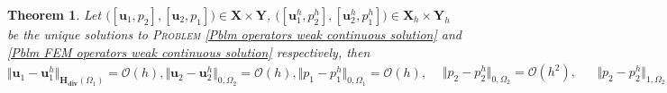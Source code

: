 \documentclass[3p]{elsarticle}
\newtheorem{theorem}{Theorem}
\def\X{\mathbf X}
\def\Y{\mathbf Y}
\def\uone{\mathbf{u}_{1}}
\def\uoneh{\mathbf{u}_{1}^{h}}
\def\utwo{\mathbf{u}_{2}}
\def\utwoh{\mathbf{u}_{2}^{h}}
\def\Hdiv{\mathbf{H_{div}}}
\def\pone{p_{1}}
\def\poneh{p_{1}^{h}}
\def\ptwo{p_{2}}
\def\ptwoh{p_{2}^{h}}
\begin{document}
\begin{theorem}\label{Th Rate of Convergence}
Let $ \big( [\uone, \ptwo], [\utwo, \pone]\big) \in \X\times \Y $, $ \big( [\uoneh, \ptwoh], [\utwoh, \poneh]\big) \in \X_{h}\times \Y_{h} $ be the unique solutions to \textsc{Problem} \eqref{Pblm operators weak continuous solution} and \eqref{Pblm FEM operators weak continuous solution} respectively, then
%
\begin{subequations}\label{Eq Rates of Convergence}
%
\begin{equation}\label{Eq Velocity One Rate of Convergence}
\big\Vert \uone - \uoneh \big\Vert_{\Hdiv(\Omega_{1})} =
\mathcal{O}(h),
\end{equation}
%
\begin{equation}\label{Eq Velocity Two Rate of Convergence}
\big\Vert \utwo - \utwoh \big\Vert_{0, \Omega_{2}} = 
\mathcal{O}(h),
\end{equation}
%
\begin{equation}\label{Eq Pressure One Rate of Convergence}
\big\Vert \pone - \poneh \big\Vert_{0, \Omega_{1}} = 
\mathcal{O}(h),
\end{equation}
%
\begin{align}\label{Eq Presure Two Rate of Convergence}
& \big\Vert \ptwo - \ptwoh \big\Vert_{0, \Omega_{2}} = 
\mathcal{O}(h^{2}), &
& \big\Vert \ptwo - \ptwoh \big\Vert_{1, \Omega_{2}} = 
\mathcal{O}(h) .
\end{align}
%
\end{subequations}
%
\end{theorem}
%
\end{document}
